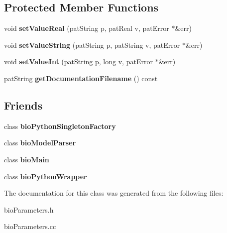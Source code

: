 \subsection*{Protected Member Functions}
\begin{DoxyCompactItemize}
\item 
\mbox{\label{classbio_parameters_a186786fe8dec2909fcb829fc03a80d6c}} 
void {\bfseries set\+Value\+Real} (pat\+String p, pat\+Real v, pat\+Error $\ast$\&err)
\item 
\mbox{\label{classbio_parameters_a34a9edb1f681daa26e90356838c4ba17}} 
void {\bfseries set\+Value\+String} (pat\+String p, pat\+String v, pat\+Error $\ast$\&err)
\item 
\mbox{\label{classbio_parameters_ad90053d5273e8919f2405cbde1b7f18a}} 
void {\bfseries set\+Value\+Int} (pat\+String p, long v, pat\+Error $\ast$\&err)
\item 
\mbox{\label{classbio_parameters_a7d5a35e153babc638897a88da8374250}} 
pat\+String {\bfseries get\+Documentation\+Filename} () const
\end{DoxyCompactItemize}
\subsection*{Friends}
\begin{DoxyCompactItemize}
\item 
\mbox{\label{classbio_parameters_a7112c3c569ac638826c63fda15012746}} 
class {\bfseries bio\+Python\+Singleton\+Factory}
\item 
\mbox{\label{classbio_parameters_aa45f0492e0bd46948fcbe4dc6bd9189e}} 
class {\bfseries bio\+Model\+Parser}
\item 
\mbox{\label{classbio_parameters_ac46cd668ee792cf4c47f784fd1abdcfd}} 
class {\bfseries bio\+Main}
\item 
\mbox{\label{classbio_parameters_a377c72e6cb4693d065e25ce3a0f5aa49}} 
class {\bfseries bio\+Python\+Wrapper}
\end{DoxyCompactItemize}


The documentation for this class was generated from the following files\+:\begin{DoxyCompactItemize}
\item 
bio\+Parameters.\+h\item 
bio\+Parameters.\+cc\end{DoxyCompactItemize}
